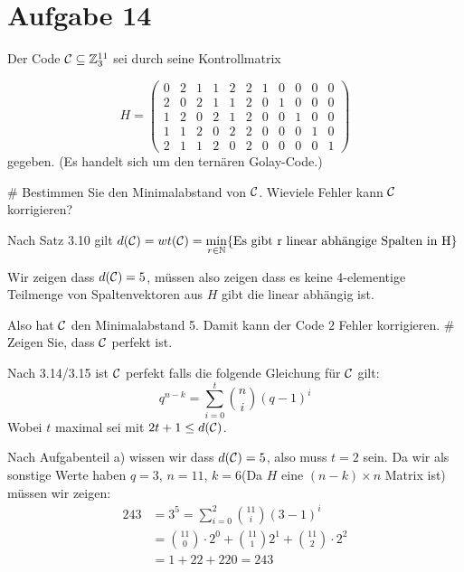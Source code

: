 \section*{Aufgabe 14}
Der Code $\mathcal{C} \subseteq \mathbb{Z}^{11}_3$ sei durch seine Kontrollmatrix

\begin{equation*}
	H =
	\begin{pmatrix}
	0 & 2 & 1 & 1 & 2 & 2 & 1 & 0 & 0 & 0 & 0 \\
	2 & 0 & 2 & 1 & 1 & 2 & 0 & 1 & 0 & 0 & 0 \\
	1 & 2 & 0 & 2 & 1 & 2 & 0 & 0 & 1 & 0 & 0 \\
	1 & 1 & 2 & 0 & 2 & 2 & 0 & 0 & 0 & 1 & 0 \\
	2 & 1 & 1 & 2 & 0 & 2 & 0 & 0 & 0 & 0 & 1
	\end{pmatrix}
\end{equation*}
gegeben.
(Es handelt sich um den ternären Golay-Code.)
\begin{myList}
#
Bestimmen Sie den Minimalabstand von $\mathcal{C}$.
Wieviele Fehler kann $\mathcal{C}$ korrigieren?

Nach Satz 3.10 gilt $d(\mathcal{C}) = wt(\mathcal{C}) = \min\limits_{r \in \mathbb{N}} \lbrace \text{Es gibt r linear abhängige Spalten in H} \rbrace$

Wir zeigen dass $d(\mathcal{C}) = 5$, müssen also zeigen dass es keine 4-elementige Teilmenge von Spaltenvektoren aus $H$ gibt die linear abhängig ist.

Also hat $\mathcal{C}$ den Minimalabstand 5. Damit kann der Code $2$ Fehler korrigieren.
#
Zeigen Sie, dass $\mathcal{C}$ perfekt ist.

Nach 3.14/3.15 ist $\mathcal{C}$ perfekt falls die folgende Gleichung für $\mathcal{C}$ gilt:
\begin{equation*}
	q^{n-k} = \sum\limits^{t}_{i = 0} \binom{n}{i} (q-1)^i
\end{equation*}
Wobei $t$ maximal sei mit $2t +1 \leq d(\mathcal{C})$.

Nach Aufgabenteil a) wissen wir dass $d(\mathcal{C}) = 5$, also muss $t =  2$ sein.
Da wir als sonstige Werte haben $q = 3$, $n = 11$, $k = 6$(Da $H$ eine $(n-k) \times n$ Matrix ist) müssen wir zeigen:
\begin{align}
	243 &=  3^5 = \sum\limits_{i = 0}^{2} \binom{11}{i} (3-1)^i \\
	&= \binom{11}{0} \cdot 2^0 + \binom{11}{1} 2^1 + \binom{11}{2} \cdot 2^2 \\
	&= 1 + 22 + 220 = 243
\end{align}
\end{myList}

